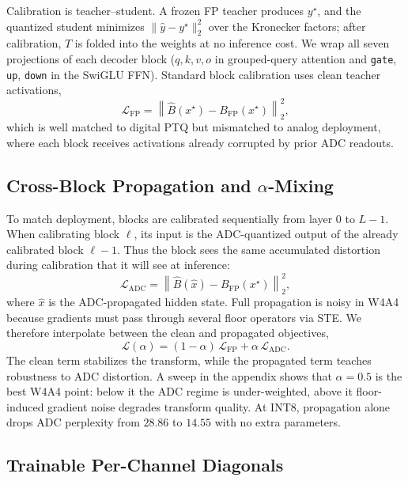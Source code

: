 \documentclass[letterpaper]{article} %
\theoremstyle{plain}
\begin{document}
Calibration is teacher--student. A frozen FP teacher produces $y^\star$, and the quantized student minimizes $\|\hat{y} - y^\star\|_2^2$ over the Kronecker factors; after calibration, $T$ is folded into the weights at no inference cost. We wrap all seven projections of each decoder block ($q,k,v,o$ in grouped-query attention and \texttt{gate}, \texttt{up}, \texttt{down} in the SwiGLU FFN). Standard block calibration uses clean teacher activations,
\begin{equation}
    \mathcal{L}_{\mathrm{FP}} = \left\| \hat{B}(x^{\star}) - B_{\mathrm{FP}}(x^{\star}) \right\|_2^2,
    \label{eq:lfp}
\end{equation}
which is well matched to digital PTQ but mismatched to analog deployment, where each block receives activations already corrupted by prior ADC readouts.

\subsection{Cross-Block Propagation and $\alpha$-Mixing}

To match deployment, blocks are calibrated sequentially from layer $0$ to $L-1$. When calibrating block $\ell$, its input is the ADC-quantized output of the already calibrated block $\ell-1$. Thus the block sees the same accumulated distortion during calibration that it will see at inference:
\begin{equation}
    \mathcal{L}_{\mathrm{ADC}} = \left\| \hat{B}(\hat{x}) - B_{\mathrm{FP}}(x^{\star}) \right\|_2^2,
    \label{eq:ladc}
\end{equation}
where $\hat{x}$ is the ADC-propagated hidden state. Full propagation is noisy in W4A4 because gradients must pass through several floor operators via STE. We therefore interpolate between the clean and propagated objectives,
\begin{equation}
    \mathcal{L}(\alpha) = (1-\alpha)\,\mathcal{L}_{\mathrm{FP}} + \alpha\,\mathcal{L}_{\mathrm{ADC}}.
    \label{eq:alpha}
\end{equation}
The clean term stabilizes the transform, while the propagated term teaches robustness to ADC distortion. A sweep in the appendix shows that $\alpha = 0.5$ is the best W4A4 point: below it the ADC regime is under-weighted, above it floor-induced gradient noise degrades transform quality. At INT8, propagation alone drops ADC perplexity from $28.86$ to $14.55$ with no extra parameters.

\subsection{Trainable Per-Channel Diagonals}
\end{document}
